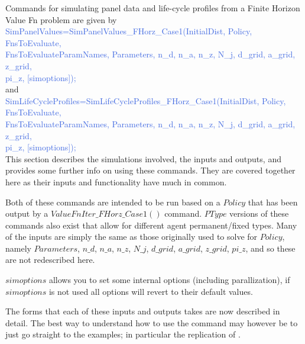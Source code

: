 Commands for simulating panel data and life-cycle profiles from a Finite Horizon Value Fn problem are given by \\
\textcolor{RoyalBlue}{SimPanelValues=SimPanelValues\_{}FHorz\_{}Case1(InitialDist, Policy, FnsToEvaluate,} \\
\indent \indent \textcolor{RoyalBlue}{FnsToEvaluateParamNames, Parameters, n\_{}d, n\_{}a, n\_{}z, N\_{}j, d\_{}grid, a\_{}grid, z\_{}grid,}\\
\indent \indent \textcolor{RoyalBlue}{pi\_{}z, [simoptions]);} \\
and \\
\textcolor{RoyalBlue}{SimLifeCycleProfiles=SimLifeCycleProfiles\_{}FHorz\_{}Case1(InitialDist, Policy, FnsToEvaluate,} \\
\indent \indent \textcolor{RoyalBlue}{FnsToEvaluateParamNames, Parameters, n\_{}d, n\_{}a, n\_{}z, N\_{}j, d\_{}grid, a\_{}grid, z\_{}grid,}\\
\indent \indent \textcolor{RoyalBlue}{pi\_{}z, [simoptions]);} \\
This section describes the simulations involved, the inputs and outputs, and provides some further info on using these commands.
They are covered together here as their inputs and functionality have much in common.

Both of these commands are intended to be run based on a $Policy$ that has been output by a $ValueFnIter\_{}FHorz\_{}Case1()$ command.
$PType$ versions of these commands also exist that allow for different agent permanent/fixed types.
Many of the inputs are simply the same as those originally used to solve for $Policy$, namely $Parameters$, $n\_{}d$, $n\_{}a$, $n\_{}z$, $N\_{}j$, $d\_{}grid$, $a\_{}grid$, $z\_{}grid$, $pi\_{}z$,
and so these are not redescribed here.

$simoptions$ allows you to set some internal options (including parallization), if $simoptions$ is not used all options will revert to their default values.

The forms that each of these inputs and outputs takes are now described in detail. The best way to understand how to use the
command may however be to just go straight to the examples; in particular the replication of \cite*{HubbardSkinnerZeldes1994}.

